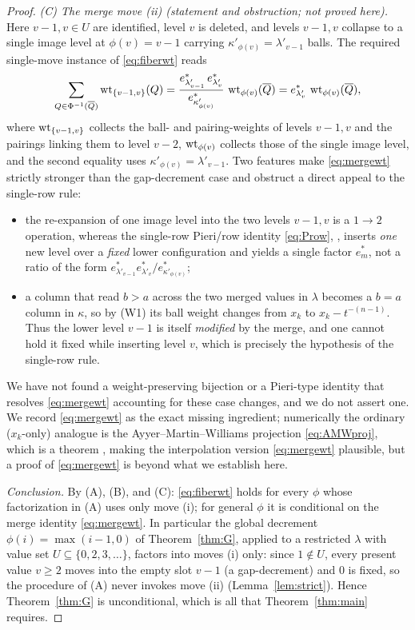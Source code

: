 \begin{proof}
\emph{(C) The merge move \textup{(ii)} (statement and obstruction; not proved here).}
Here $v-1,v\in U$ are identified, level $v$ is deleted, and levels $v-1,v$ collapse to
a single image level at $\phi(v)=v-1$ carrying $\kappa'_{\phi(v)}=\lambda'_{v-1}$ balls.
The required single-move instance of \eqref{eq:fiberwt} reads
\begin{equation}\label{eq:mergewt}
\sum_{Q\in\Phi^{-1}(\overline Q)}\operatorname{wt}_{\{v-1,v\}}(Q)
=\frac{e^*_{\lambda'_{v-1}}\,e^*_{\lambda'_v}}{e^*_{\kappa'_{\phi(v)}}}\,
\operatorname{wt}_{\phi(v)}(\overline Q)
=e^*_{\lambda'_v}\,\operatorname{wt}_{\phi(v)}(\overline Q),
\end{equation}
where $\operatorname{wt}_{\{v-1,v\}}$ collects the ball- and pairing-weights of levels
$v-1,v$ and the pairings linking them to level $v-2$, $\operatorname{wt}_{\phi(v)}$ collects
those of the single image level, and the second equality uses
$\kappa'_{\phi(v)}=\lambda'_{v-1}$. Two features make \eqref{eq:mergewt} strictly
stronger than the gap-decrement case and obstruct a direct appeal to the single-row
rule:
\begin{itemize}
\item the re-expansion of one image level into the two levels $v-1,v$ is a $1\to2$
operation, whereas the single-row Pieri/row identity \eqref{eq:Prow},
\cite[Lem.~5.4]{AMW25}, \cite[Lem.~5.6]{BDW25a} inserts \emph{one} new level over a
\emph{fixed} lower configuration and yields a single factor $e^*_m$, not a ratio of
the form $e^*_{\lambda'_{v-1}}e^*_{\lambda'_v}/e^*_{\kappa'_{\phi(v)}}$;
\item a column that read $b>a$ across the two merged values in $\lambda$ becomes a
$b=a$ column in $\kappa$, so by (W1) its ball weight changes from $x_k$ to
$x_k-t^{-(n-1)}$. Thus the lower level $v-1$ is itself \emph{modified} by the merge,
and one cannot hold it fixed while inserting level $v$, which is precisely the
hypothesis of the single-row rule.
\end{itemize}
We have not found a weight-preserving bijection or a Pieri-type identity that resolves
\eqref{eq:mergewt} accounting for these case changes, and we do not assert one. We
record \eqref{eq:mergewt} as the exact missing ingredient; numerically the ordinary
($x_k$-only) analogue is the Ayyer--Martin--Williams projection \eqref{eq:AMWproj},
which is a theorem \cite[Prop.~6.1]{AMW25}, making the interpolation version
\eqref{eq:mergewt} plausible, but a proof of \eqref{eq:mergewt} is beyond what we
establish here.

\emph{Conclusion.} By (A), (B), and (C): \eqref{eq:fiberwt} holds for every $\phi$
whose factorization in (A) uses only move \textup{(i)}; for general $\phi$ it is
conditional on the merge identity \eqref{eq:mergewt}. In particular the global decrement
$\phi(i)=\max(i-1,0)$ of Theorem~\ref{thm:G}, applied to a restricted $\lambda$ with
value set $U\subseteq\{0,2,3,\dots\}$, factors into moves \textup{(i)} only: since
$1\notin U$, every present value $v\ge2$ moves into the empty slot $v-1$ (a
gap-decrement) and $0$ is fixed, so the procedure of \textup{(A)} never invokes move
\textup{(ii)} (Lemma~\ref{lem:strict}). Hence Theorem~\ref{thm:G} is unconditional,
which is all that Theorem~\ref{thm:main} requires.
\end{proof}

